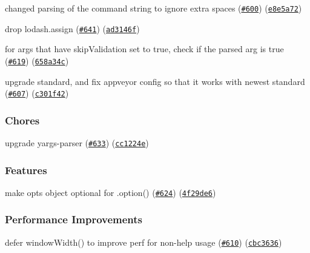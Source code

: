 \begin{DoxyItemize}
\item changed parsing of the command string to ignore extra spaces (\href{https://github.com/yargs/yargs/issues/600}{\tt \#600}) (\href{https://github.com/yargs/yargs/commit/e8e5a72}{\tt e8e5a72})
\item drop lodash.\+assign (\href{https://github.com/yargs/yargs/issues/641}{\tt \#641}) (\href{https://github.com/yargs/yargs/commit/ad3146f}{\tt ad3146f})
\item for args that have skip\+Validation set to {\ttfamily true}, check if the parsed arg is {\ttfamily true} (\href{https://github.com/yargs/yargs/issues/619}{\tt \#619}) (\href{https://github.com/yargs/yargs/commit/658a34c}{\tt 658a34c})
\item upgrade standard, and fix appveyor config so that it works with newest standard (\href{https://github.com/yargs/yargs/issues/607}{\tt \#607}) (\href{https://github.com/yargs/yargs/commit/c301f42}{\tt c301f42})
\end{DoxyItemize}

\subsubsection*{Chores}


\begin{DoxyItemize}
\item upgrade yargs-\/parser (\href{https://github.com/yargs/yargs/issues/633}{\tt \#633}) (\href{https://github.com/yargs/yargs/commit/cc1224e}{\tt cc1224e})
\end{DoxyItemize}

\subsubsection*{Features}


\begin{DoxyItemize}
\item make opts object optional for .option() (\href{https://github.com/yargs/yargs/issues/624}{\tt \#624}) (\href{https://github.com/yargs/yargs/commit/4f29de6}{\tt 4f29de6})
\end{DoxyItemize}

\subsubsection*{Performance Improvements}


\begin{DoxyItemize}
\item defer window\+Width() to improve perf for non-\/help usage (\href{https://github.com/yargs/yargs/issues/610}{\tt \#610}) (\href{https://github.com/yargs/yargs/commit/cbc3636}{\tt cbc3636})
\end{DoxyItemize}

